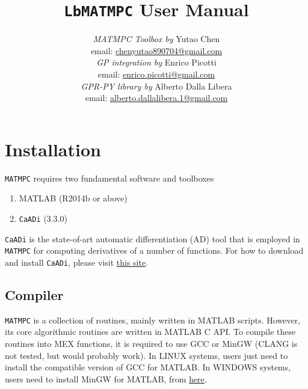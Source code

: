 \documentclass{article}
\newcommand{\software}[1]{{\tt#1}}
\begin{document}
	\title{\software{LbMATMPC} User Manual}
	\author{\textit{MATMPC Toolbox by} Yutao Chen\\ email: \href{mailto:chenyutao890704@gmail.com}{chenyutao890704@gmail.com}\\
	\textit{GP integration by} Enrico Picotti\\ email: 
	\href{mailto:enrico.picotti@gmail.com}{enrico.picotti@gmail.com} \\
	\textit{GPR-PY library by} Alberto Dalla Libera\\ email: 
	\href{mailto:alberto.dallalibera.1@gmail.com}{alberto.dallalibera.1@gmail.com}}
	
	\maketitle
	
	\tableofcontents
	
	\newpage
	
\section{Installation}
\software{MATMPC} requires two fundamental software and toolboxes
\begin{enumerate}
	\item MATLAB (R2014b or above) 
	\item \software{CaADi} (3.3.0)
\end{enumerate}
\software{CaADi} is the state-of-art automatic differentiation (AD) tool \cite{andersson2018casadi} that is employed in \software{MATMPC} for computing derivatives of a number of functions. For how to download and install \software{CaADi}, please visit \href{https://github.com/casadi/casadi/wiki/InstallationInstructions}{this site}.

\subsection{Compiler}
\software{MATMPC} is a collection of routines, mainly written in MATLAB scripts. However, its core algorithmic routines are written in MATLAB C API. To compile these routines into MEX functions, it is required to use GCC or MinGW (CLANG is not tested, but would probably work). In LINUX systems, users just need to install the compatible version of GCC for MATLAB. In WINDOWS systems, users need to install MinGW for MATLAB, from \href{https://www.mathworks.com/matlabcentral/fileexchange/52848-matlab-support-for-mingw-w64-c-c-compiler}{here}.
\end{document}
